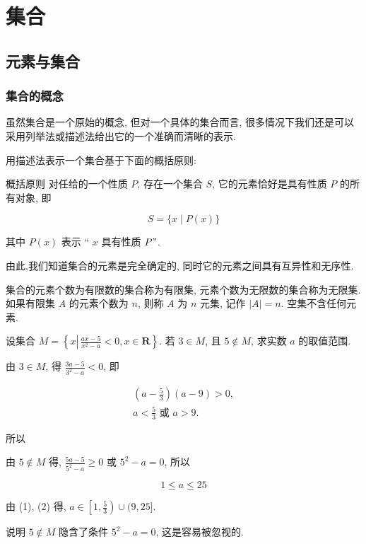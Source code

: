 \chapter{集合}
\section{元素与集合}
\subsection{集合的概念}
虽然集合是一个原始的概念, 但对一个具体的集合而言, 很多情况下我们还是可以采用列举法或描述法给出它的一个准确而清晰的表示.

用描述法表示一个集合基于下面的概括原则:

概括原则 对任给的一个性质 $P$, 存在一个集合 $S$, 它的元素恰好是具有性质 $P$ 的所有对象, 即

$$
	S=\{x \mid P(x)\}
$$

其中 $P(x)$ 表示 “ $x$ 具有性质 $P "$.

由此,我们知道集合的元素是完全确定的, 同时它的元素之间具有互异性和无序性.

集合的元素个数为有限数的集合称为有限集, 元素个数为无限数的集合称为无限集. 如果有限集 $A$ 的元素个数为 $n$, 则称 $A$ 为 $n$ 元集, 记作 $|A|=n$. 空集不含任何元素.

\begin{example}
	设集合 $M=\left\{x \left\lvert\, \frac{a x-5}{x^{2}-a}<0\right., x \in \mathbf{R}\right\}$. 若 $3 \in M$, 且 $5 \notin M$, 求实数 $a$ 的取值范围.
\end{example}
\begin{solution}
	由 $3 \in M$, 得 $\frac{3 a-5}{3^{2}-a}<0$, 即

	\begin{gather*}
		\left(a-\frac{5}{3}\right)(a-9)>0, \\
		a<\frac{5}{3} \text { 或 } a>9 . \tag{1}
	\end{gather*}


	所以

	由 $5 \notin M$ 得, $\frac{5 a-5}{5^{2}-a} \geqslant 0$ 或 $5^{2}-a=0$, 所以

	\begin{equation*}
		1 \leqslant a \leqslant 25 \tag{2}
	\end{equation*}


	由 (1), (2) 得, $a \in\left[1, \frac{5}{3}\right) \cup(9,25]$.

	说明 $5 \notin M$ 隐含了条件 $5^{2}-a=0$, 这是容易被忽视的.
\end{solution}

